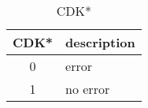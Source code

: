 %
%
\begin{table}[htbp]
\caption{CDK*}
   \begin{center}
   \begin{tabular}{|c|l|} \hline
      CDK* & description \\ \hline \hline
      0    & error \\ \hline
      1    & no error \\ \hline
   \end{tabular}
   \end{center}
\end{table}
%
%
